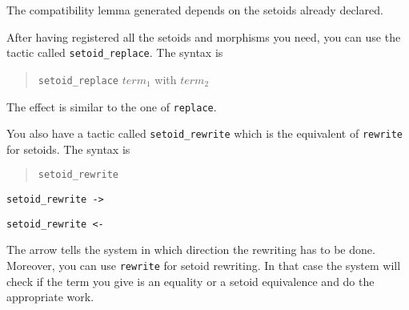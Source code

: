 \begin{ErrMsgs}
\item {}
\item {}
\item {}
\end{ErrMsgs}

The compatibility lemma generated depends on the setoids already
declared.


After having registered all the setoids and morphisms you need, you can
use the tactic called \texttt{setoid\_replace}. The syntax is

\begin{quotation}
\texttt{setoid\_replace} $ term_1$ with $term_2$
\end{quotation}

The effect is similar to the one of \texttt{replace}.

You also have a tactic called \texttt{setoid\_rewrite} which is the
equivalent of \texttt{rewrite} for setoids. The syntax is 

\begin{quotation}
\texttt{setoid\_rewrite} \term
\end{quotation}

\begin{Variants}
 \item \texttt{setoid\_rewrite ->} \term
 \item \texttt{setoid\_rewrite <-} \term
\end{Variants}

The arrow tells the system in which direction the rewriting has to be
done. Moreover, you can use \texttt{rewrite} for setoid
rewriting. In that case the system will check if the term you give is
an equality or a setoid equivalence and do the appropriate work.

